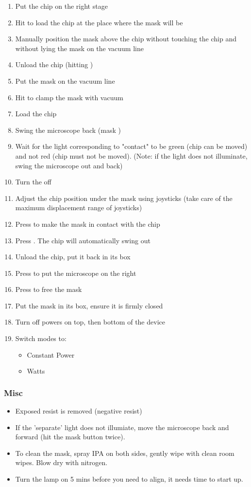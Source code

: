 \documentclass[12pt,a4paper]{report}
\begin{document}
\begin{enumerate}
\item Put the chip on the right stage
\item Hit  to load the chip at the place where the mask will be
\item Manually position the mask above the chip without touching the chip and without lying the mask on the vacuum line
\item Unload the chip (hitting )
\item Put the mask on the vacuum line
\item Hit  to clamp the mask with vacuum
\item Load the chip
\item Swing the microscope back (mask )
\item Wait for the light corresponding to "contact" to be green (chip can be moved) and not red (chip must not be moved).
(Note: if the light does not illuminate, swing the microscope out and back)
\item Turn the  off
\item Adjust the chip position under the mask using joysticks (take care of the maximum displacement range of joysticks)
\item Press  to make the mask in contact with the chip
\item Press . The chip will automatically swing out
\item Unload the chip, put it back in its box
\item Press  to put the microscope on the right
\item Press  to free the mask
\item Put the mask in its box, ensure it is firmly closed
\item Turn off powers on top, then bottom of the device
\item Switch modes to:
\begin{itemize}[nolistsep, noitemsep]
\item Constant Power
\item Watts
\end{itemize}
\end{enumerate}
\newpage
\subsubsection{Misc}
\begin{itemize}
\item Exposed resist is removed (negative resist)
\item If the 'separate' light does not illumiate, move the microscope back and forward (hit the mask  button twice).
\item To clean the mask, spray IPA on both sides, gently wipe with clean room wipes. Blow dry with nitrogen.
\item Turn the lamp on 5 mins before you need to align, it needs time to start up.
\end{itemize}
\newpage
\end{document}
